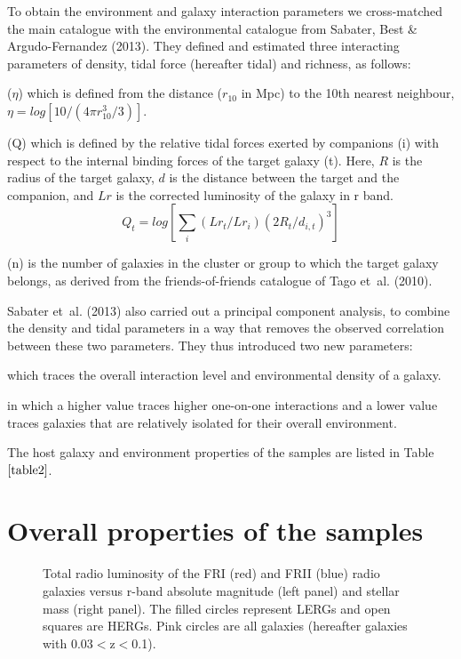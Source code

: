 \documentclass[usenatbib]{mn2e}
\begin{document}
To obtain the environment and galaxy interaction parameters we
cross-matched the main catalogue with the environmental catalogue from
Sabater, Best \& Argudo-Fernandez (2013).
They defined and estimated three interacting parameters of density, tidal
force (hereafter tidal) and richness, as follows:

\begin{description}[align=left]
\item [density] ($\eta$) which is defined from the distance ($r_{10}$ in
  Mpc) to the 10th nearest neighbour, $\eta =log[ 10/(4\pi
    r_{10}^{3} /3)]$.
\item [tidal interaction] (Q) which is defined by the relative tidal
  forces exerted by companions (i) with respect to the internal binding
  forces of the target galaxy (t). Here, $R$ is the radius of the target
  galaxy, $d$ is the distance between the target and the companion, and
  $Lr$ is the corrected luminosity of the galaxy in r band. $$Q_{t}= log
  \left[\sum_{i} (Lr_{t}/Lr_{i}){(2R_{t}/d_{i,t})}^{3} \right] $$
\item [richness] (n) is the number of galaxies in the cluster or group
  to which the target galaxy belongs, as derived from the friends-of-friends
  catalogue of Tago et~al. (2010).
\end{description}

Sabater et~al. (2013) also carried out a principal component analysis, to combine
the density and tidal parameters in a way that removes the observed
correlation between these two parameters. They thus introduced two new
parameters:

\begin{description}[align=left]
\item [PCA1] which traces the overall interaction level and environmental
  density of a galaxy.
\item [PCA2] in which a higher value traces higher one-on-one interactions
  and a lower value traces galaxies that are relatively isolated for their overall environment.
\end{description}

The host galaxy and environment properties of the samples are listed in
Table~$\ref{table2}$.


\section {Overall properties of the samples}
\label{sec:overal}


\begin{figure*}
\center

\caption{Total radio luminosity of the FRI (red) and FRII (blue) radio
  galaxies versus r-band absolute magnitude (left panel) and stellar mass
  (right panel). The filled circles represent LERGs and open squares are
  HERGs. Pink circles are all galaxies (hereafter galaxies with 0.03$<$z$<$0.1).}
\label{RadioOpt}
\end{figure*}
\end{document}
